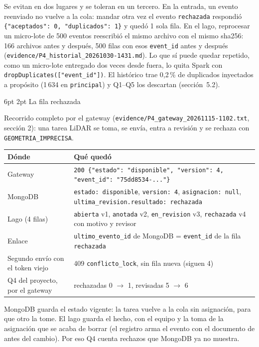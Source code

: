 \documentclass[10pt,letterpaper]{article}
\makeatletter
\newcommand{\ev}[1]{{\footnotesize\texttt{evidence/\allowbreak #1}}}
\renewcommand\subsection{\@startsection{subsection}{2}{\z@}%
  {6pt \@plus 1pt}{2pt}%
  {\normalfont\normalsize\bfseries\color{acc}}}
\makeatother
\begin{document}
Se evitan en dos lugares y se toleran en un tercero. En la entrada, un evento reenviado no vuelve a la cola:
mandar otra vez el evento \texttt{rechazada} respondió \texttt{\{"aceptados": 0, "duplicados": 1\}} y quedó 1
sola fila. En el lago, reprocesar un micro-lote de 500 eventos reescribió el mismo archivo con el mismo
sha256: 166 archivos antes y después, 500 filas con esos \texttt{event\_id} antes y después
(\ev{P4\_historial\_20261030-1431.md}). Lo que sí puede quedar repetido, como un micro-lote entregado dos veces
desde fuera, lo quita Spark con \texttt{dropDuplicates(["event\_id"])}. El histórico trae 0,2\,\% de
duplicados inyectados a propósito (1\,634 en \texttt{principal}) y Q1--Q5 los descartan (sección~5.2).

\subsection{La fila rechazada}

Recorrido completo por el gateway (\ev{P4\_gateway\_20261115-1102.txt}, sección 2): una tarea LiDAR se toma,
se envía, entra a revisión y se rechaza con \texttt{GEOMETRIA\_IMPRECISA}.

\begin{center}\footnotesize
\begin{tabular}{@{}ll@{}}
\toprule
Dónde & Qué quedó \\
\midrule
Gateway & \texttt{200 \{"estado": "disponible", "version": 4, "event\_id": "75dd8534-..."\}} \\
MongoDB & \texttt{estado: disponible}, \texttt{version: 4}, \texttt{asignacion: null},
\texttt{ultima\_revision.resultado: rechazada} \\
Lago (4 filas) & \texttt{abierta} v1, \texttt{anotada} v2, \texttt{en\_revision} v3, \texttt{rechazada} v4 con
motivo y revisor \\
Enlace & \texttt{ultimo\_evento\_id} de MongoDB = \texttt{event\_id} de la fila \texttt{rechazada} \\
Segundo envío con el token viejo & 409 \texttt{conflicto\_lock}, sin fila nueva (siguen 4) \\
Q4 del proyecto, por el gateway & rechazadas 0 $\rightarrow$ 1, revisadas 5 $\rightarrow$ 6 \\
\bottomrule
\end{tabular}
\end{center}

MongoDB guarda el estado vigente: la tarea vuelve a la cola sin asignación, para que otro la tome. El lago
guarda el hecho, con el equipo y la toma de la asignación que se acaba de borrar (el registro arma el evento
con el documento de antes del cambio). Por eso Q4 cuenta rechazos que MongoDB ya no muestra.
\end{document}
